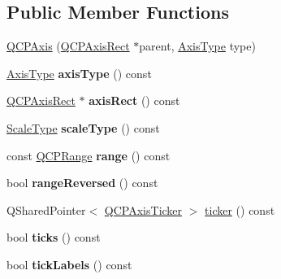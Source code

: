 \subsection*{Public Member Functions}
\begin{DoxyCompactItemize}
\item 
\hyperlink{class_q_c_p_axis_ac62c042968bae0e6d474fcfc57c9b71f}{Q\+C\+P\+Axis} (\hyperlink{class_q_c_p_axis_rect}{Q\+C\+P\+Axis\+Rect} $\ast$parent, \hyperlink{class_q_c_p_axis_ae2bcc1728b382f10f064612b368bc18a}{Axis\+Type} type)
\item 
\hyperlink{class_q_c_p_axis_ae2bcc1728b382f10f064612b368bc18a}{Axis\+Type} {\bfseries axis\+Type} () const \hypertarget{class_q_c_p_axis_a593c37bf6aa4990326dc09e24f45db7f}{}\label{class_q_c_p_axis_a593c37bf6aa4990326dc09e24f45db7f}

\item 
\hyperlink{class_q_c_p_axis_rect}{Q\+C\+P\+Axis\+Rect} $\ast$ {\bfseries axis\+Rect} () const \hypertarget{class_q_c_p_axis_aada3102af43b029e3879bcbf2bddfabb}{}\label{class_q_c_p_axis_aada3102af43b029e3879bcbf2bddfabb}

\item 
\hyperlink{class_q_c_p_axis_a36d8e8658dbaa179bf2aeb973db2d6f0}{Scale\+Type} {\bfseries scale\+Type} () const \hypertarget{class_q_c_p_axis_a8563e13407bc0616da7f7c84e02de170}{}\label{class_q_c_p_axis_a8563e13407bc0616da7f7c84e02de170}

\item 
const \hyperlink{class_q_c_p_range}{Q\+C\+P\+Range} {\bfseries range} () const \hypertarget{class_q_c_p_axis_ab1ea79a4f5ea4cf42620f8f51c477ac4}{}\label{class_q_c_p_axis_ab1ea79a4f5ea4cf42620f8f51c477ac4}

\item 
bool {\bfseries range\+Reversed} () const \hypertarget{class_q_c_p_axis_ade26dc7994ccd8a11f64fd83377ee021}{}\label{class_q_c_p_axis_ade26dc7994ccd8a11f64fd83377ee021}

\item 
Q\+Shared\+Pointer$<$ \hyperlink{class_q_c_p_axis_ticker}{Q\+C\+P\+Axis\+Ticker} $>$ \hyperlink{class_q_c_p_axis_acdd672979a52b1f31e2da3518c92616d}{ticker} () const 
\item 
bool {\bfseries ticks} () const \hypertarget{class_q_c_p_axis_a61c504ec7c5bed9a63edf45345995d10}{}\label{class_q_c_p_axis_a61c504ec7c5bed9a63edf45345995d10}

\item 
bool {\bfseries tick\+Labels} () const \hypertarget{class_q_c_p_axis_a9a78fcccd98a73d37b3d991df7b6ef1d}{}\label{class_q_c_p_axis_a9a78fcccd98a73d37b3d991df7b6ef1d}


\end{DoxyCompactItemize}
